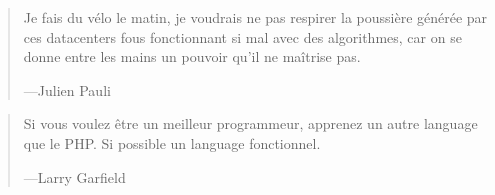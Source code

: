 \begin{frame}
    \begin{quote}
        Je fais du vélo le matin, je voudrais ne pas respirer la poussière générée
        par ces datacenters fous fonctionnant si mal avec des algorithmes,
        car on se donne entre les mains un pouvoir qu'il ne maîtrise pas.

        \begin{flushright}
            \tiny{---Julien Pauli}
        \end{flushright}
    \end{quote}
\end{frame}

\begin{frame}
    \begin{quote}
        Si vous voulez être un meilleur programmeur, apprenez un autre language que
        le PHP. Si possible un language fonctionnel.

        \begin{flushright}
            \tiny{---Larry Garfield}
        \end{flushright}
    \end{quote}
\end{frame}


